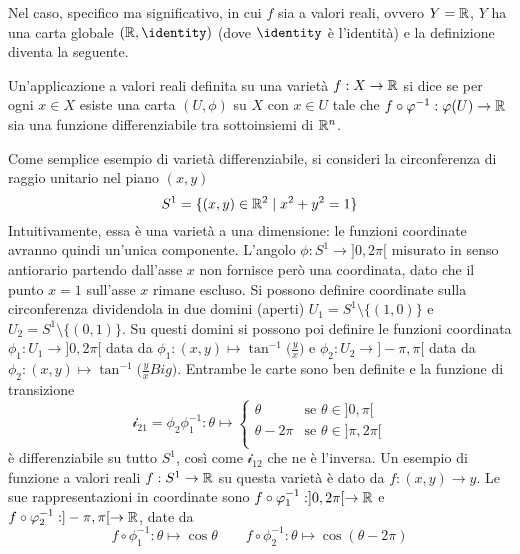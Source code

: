 Nel caso, specifico ma significativo, in cui $f$ sia a valori reali, ovvero $Y = \mathbb{R}$, $Y$ ha una carta globale $(\R, \identity)$ (dove $\identity$ è l'identità) e la definizione diventa la seguente.
\begin{definition}
  Un'applicazione a valori reali definita su una varietà $f:X\to \mathbb{R}$ si dice  se per ogni $x \in X$ esiste una carta $(U, \phi)$ su $X$ con $x \in  U$ tale che $f\circ \varphi^{-1}: \varphi(U) \to \mathbb{R}$ sia una funzione differenziabile tra sottoinsiemi di $\mathbb{R}^{n}$.
\end{definition}

Come semplice esempio di varietà differenziabile, si consideri la circonferenza di raggio unitario nel piano $(x,y)$
\begin{equation*}
S^1 = \{(x,y) \in \mathbb{R}^2 \mid x^2+y^2=1\} 
\end{equation*} 
Intuitivamente, essa è una varietà a una dimensione: le funzioni coordinate avranno quindi un'unica componente. L'angolo $\phi: S^1 \to ]0,2 \pi[$ misurato in senso antiorario partendo dall'asse $x$ non fornisce però una coordinata, dato che il punto $x=1$ sull'asse $x$ rimane escluso. Si possono definire coordinate sulla circonferenza dividendola in due domini (aperti) $U_1 = S^1 \setminus \{(1,0)\}$ e $U_2 = S^1 \setminus \{(0,1)\}$. Su questi domini si possono poi definire le funzioni coordinata $\phi_1: U_1 \to ]0,2 \pi[$ data da $\phi_1: (x,y)\mapsto \tan^{-1}\Big(\frac{y}{x}\Big)$ e $\phi_2: U_2 \to ]-\pi,\pi[$ data da $\phi_2: (x,y)\mapsto \tan^{-1}\Big(\frac{y}{x}Big)$. Entrambe le carte sono ben definite e la funzione di transizione
\begin{equation*}
\mathcal{i}_{21} = \phi_2\phi_1^{-1}: \theta \mapsto  \begin{cases}
  \theta & \text{se } \theta \in ]0, \pi[\\
  \theta-2\pi & \text{se } \theta \in ]\pi, 2\pi[\\
\end{cases}
\end{equation*}
è differenziabile su tutto $S^1$, così come $\mathcal{i}_{12}$ che ne è l'inversa. Un esempio di funzione a valori reali $f:S^1 \to \mathbb{R}$ su questa varietà è dato da $f:(x,y)\to y$. Le sue rappresentazioni in coordinate sono $f \circ \varphi_1^{-1}: ]0, 2\pi[ \to \mathbb{R}$ e $f \circ \varphi_2^{-1}: ]- \pi, \pi[ \to \mathbb{R}$, date da
\begin{equation*}
f \circ \phi_1^{-1}: \theta \mapsto \cos \theta \qquad f \circ \phi_2^{-1}: \theta \mapsto \cos(\theta - 2 \pi)
\end{equation*} 

